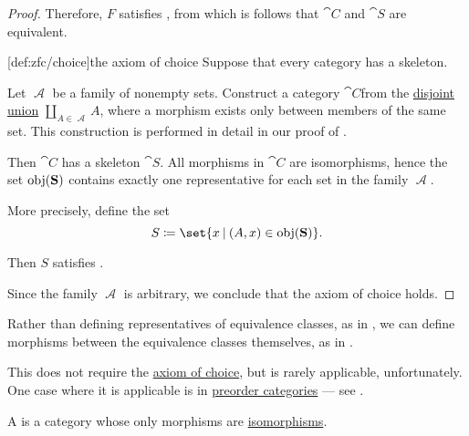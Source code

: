 \begin{proof}
  Therefore, \( F \) satisfies , from which is follows that \( \cat{C} \) and \( \cat{S} \) are equivalent.

  [def:zfc/choice]{the axiom of choice} Suppose that every category has a skeleton.

  Let \( \mscrA \) be a family of nonempty sets. Construct a category \( \cat{C} \)from the \hyperref[def:disjoint_union]{disjoint union} \( \coprod_{A \in \mscrA} A \), where a morphism exists only between members of the same set. This construction is performed in detail in our proof of .

  Then \( \cat{C} \) has a skeleton \( \cat{S} \). All morphisms in \( \cat{C} \) are isomorphisms, hence the set \( \operatorname{obj}(\operatorname{\mathbf{S}}) \) contains exactly one representative for each set in the family \( \mscrA \).

  More precisely, define the set
  \begin{equation*}
    S \coloneqq \set{ x \given (A, x) \in \obj(\cat{S}) }.
  \end{equation*}

  Then \( S \) satisfies .

  Since the family \( \mscrA \) is arbitrary, we conclude that the axiom of choice holds.
\end{proof}

\begin{remark}\label{rem:skeletons_and_preorder_categories}
  Rather than defining representatives of equivalence classes, as in , we can define morphisms between the equivalence classes themselves, as in .

  This does not require the \hyperref[def:zfc/choice]{axiom of choice}, but is rarely applicable, unfortunately. One case where it is applicable is in \hyperref[def:preorder_category]{preorder categories} --- see .
\end{remark}

\begin{definition}\label{def:groupoid}
  A  is a category whose only morphisms are \hyperref[def:morphism_invertibility/isomorphism]{isomorphisms}.
\end{definition}

